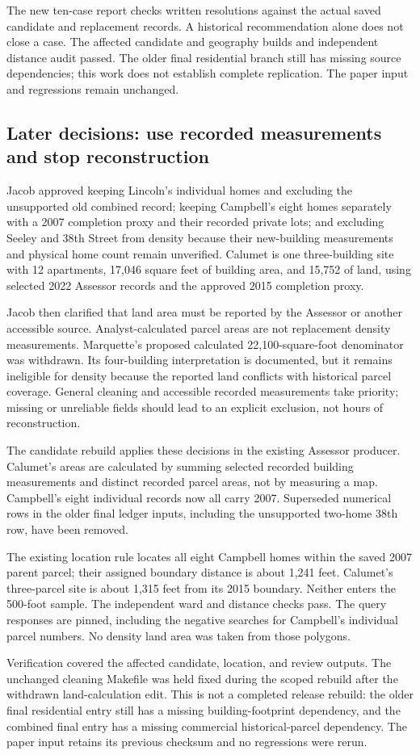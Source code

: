 The new ten-case report checks written resolutions against the actual saved
candidate and replacement records. A historical recommendation alone does not close
a case. The affected candidate and geography builds and independent distance audit
passed. The older final residential branch still has missing source dependencies;
this work does not establish complete replication. The paper input and regressions
remain unchanged.

\subsection*{Later decisions: use recorded measurements and stop reconstruction}
Jacob approved keeping Lincoln's individual homes and excluding the unsupported
old combined record; keeping Campbell's eight homes separately with a 2007 completion
proxy and their recorded private lots; and excluding Seeley and 38th Street from
density because their new-building measurements and physical home count remain
unverified. Calumet is one three-building site with 12 apartments, 17,046 square feet
of building area, and 15,752 of land, using selected 2022 Assessor records and the
approved 2015 completion proxy.

Jacob then clarified that land area must be reported by the Assessor or another
accessible source. Analyst-calculated parcel areas are not replacement density
measurements. Marquette's proposed calculated 22,100-square-foot denominator was
withdrawn. Its four-building interpretation is documented, but it remains ineligible
for density because the reported land conflicts with historical parcel coverage.
General cleaning and accessible recorded measurements take priority; missing or
unreliable fields should lead to an explicit exclusion, not hours of reconstruction.

The candidate rebuild applies these decisions in the existing Assessor producer.
Calumet's areas are calculated by summing selected recorded building measurements
and distinct recorded parcel areas, not by measuring a map. Campbell's eight
individual records now all carry 2007. Superseded numerical rows in the older final
ledger inputs, including the unsupported two-home 38th row, have been removed.

The existing location rule locates all eight Campbell homes within the saved 2007
parent parcel; their assigned boundary distance is about 1,241 feet. Calumet's
three-parcel site is about 1,315 feet from its 2015 boundary. Neither enters the
500-foot sample. The independent ward and distance checks pass. The query responses
are pinned, including the negative searches for Campbell's individual parcel numbers.
No density land area was taken from those polygons.

Verification covered the affected candidate, location, and review outputs. The
unchanged cleaning Makefile was held fixed during the scoped rebuild after the
withdrawn land-calculation edit. This is not a completed release rebuild: the older
final residential entry still has a missing building-footprint dependency, and the
combined final entry has a missing commercial historical-parcel dependency. The
paper input retains its previous checksum and no regressions were rerun.
